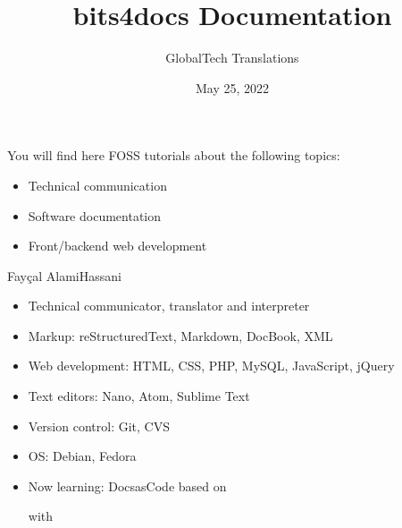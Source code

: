 \documentclass[a4paper,10pt,english,openany,oneside]{sphinxmanual}
\title{bits4docs Documentation}
\date{May 25, 2022}
\author{GlobalTech Translations}
\begin{document}
\begin{sloppypar}

\pagestyle{empty}
\sphinxmaketitle
\pagestyle{plain}
\sphinxtableofcontents
\pagestyle{normal}
\label{\detokenize{index::doc}}


\sphinxAtStartPar
You will find here FOSS tutorials about the following topics:
\begin{itemize}
\item {} 
\sphinxAtStartPar
Technical communication

\item {} 
\sphinxAtStartPar
Software documentation

\item {} 
\sphinxAtStartPar
Front/backend web development

\end{itemize}

\sphinxAtStartPar
{}

\sphinxAtStartPar
Fayçal Alami\sphinxhyphen{}Hassani \sphinxhyphen{} %
\begin{footnote}[1]\sphinxAtStartFootnote
{}
%
\end{footnote} \sphinxhyphen{} %
\begin{footnote}[2]\sphinxAtStartFootnote
{}
%
\end{footnote}
\begin{itemize}
\item {} 
\sphinxAtStartPar
Technical communicator, translator and interpreter

\item {} 
\sphinxAtStartPar
Markup: reStructuredText, Markdown, DocBook, XML

\item {} 
\sphinxAtStartPar
Web development: HTML, CSS, PHP, MySQL, JavaScript, jQuery

\item {} 
\sphinxAtStartPar
Text editors: Nano, Atom, Sublime Text

\item {} 
\sphinxAtStartPar
Version control: Git, CVS

\item {} 
\sphinxAtStartPar
OS: Debian, Fedora

\item {} 
\sphinxAtStartPar
Now learning: Docs\sphinxhyphen{}as\sphinxhyphen{}Code based on %
\begin{footnote}[3]\sphinxAtStartFootnote
{}
%
\end{footnote} with %
\begin{footnote}[4]\sphinxAtStartFootnote
{}
%
\end{footnote}


\end{itemize}
\end{sloppypar}
\end{document}

